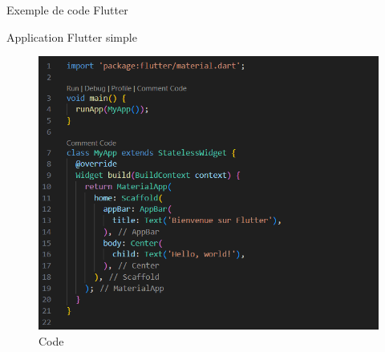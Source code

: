\documentclass{clbeamer2024}
\begin{document}
		\begin{frame}{Exemple de code Flutter}
			\begin{exampleblock}{Application Flutter simple}
				
				\begin{figure}[h] %
					\centering
					\begin{minipage}{0.6\textwidth}
						\centering
						\includegraphics[width=\linewidth]{test/code.png}
						\caption{Code}
						\label{fig:image1}
					\end{minipage}
					\hfill %
					\begin{minipage}{0.3\textwidth}
						\centering

\end{minipage}
\end{figure}
\end{exampleblock}
\end{frame}
\end{document}
